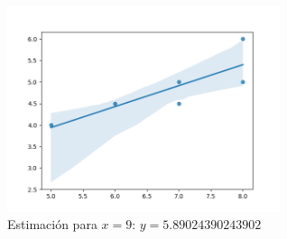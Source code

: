 \documentclass[addpoints,spanish, 12pt,a4paper]{exam}
\begin{document}
\begin{questions}
\begin{solution}
\includegraphics[width=8cm]{pendientes_1_bach/1_sociales/regresion1.png} 
\\

Estimación para $x=9$:
$y=5.89024390243902$

\end{solution}



\end{questions}
\end{document}
